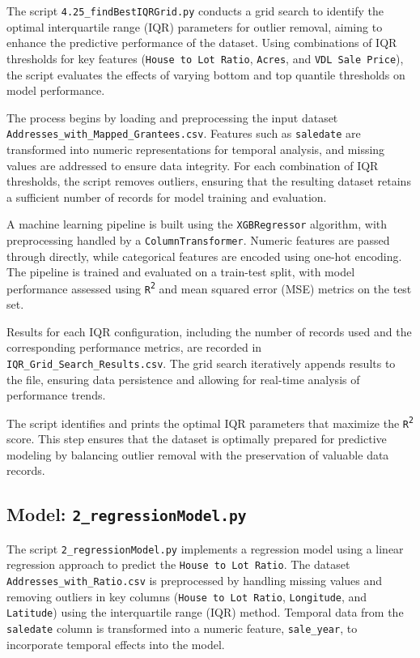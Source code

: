 The script \texttt{4.25\_findBestIQRGrid.py} conducts a grid search to identify the optimal interquartile range (IQR) parameters for outlier removal, aiming to enhance the predictive performance of the dataset. Using combinations of IQR thresholds for key features (\texttt{House to Lot Ratio}, \texttt{Acres}, and \texttt{VDL Sale Price}), the script evaluates the effects of varying bottom and top quantile thresholds on model performance.

The process begins by loading and preprocessing the input dataset \texttt{Addresses\_with\_Mapped\_Grantees.csv}. Features such as \texttt{saledate} are transformed into numeric representations for temporal analysis, and missing values are addressed to ensure data integrity. For each combination of IQR thresholds, the script removes outliers, ensuring that the resulting dataset retains a sufficient number of records for model training and evaluation.

A machine learning pipeline is built using the \texttt{XGBRegressor} algorithm, with preprocessing handled by a \texttt{ColumnTransformer}. Numeric features are passed through directly, while categorical features are encoded using one-hot encoding. The pipeline is trained and evaluated on a train-test split, with model performance assessed using \texttt{R\textsuperscript{2}} and mean squared error (MSE) metrics on the test set.

Results for each IQR configuration, including the number of records used and the corresponding performance metrics, are recorded in \texttt{IQR\_Grid\_Search\_Results.csv}. The grid search iteratively appends results to the file, ensuring data persistence and allowing for real-time analysis of performance trends.

The script identifies and prints the optimal IQR parameters that maximize the \texttt{R\textsuperscript{2}} score. This step ensures that the dataset is optimally prepared for predictive modeling by balancing outlier removal with the preservation of valuable data records. \\

\hrulefill

\subsection{Model: \texttt{2\_regressionModel.py}}

The script \texttt{2\_regressionModel.py} implements a regression model using a linear regression approach to predict the \texttt{House to Lot Ratio}. The dataset \texttt{Addresses\_with\_Ratio.csv} is preprocessed by handling missing values and removing outliers in key columns (\texttt{House to Lot Ratio}, \texttt{Longitude}, and \texttt{Latitude}) using the interquartile range (IQR) method. Temporal data from the \texttt{saledate} column is transformed into a numeric feature, \texttt{sale\_year}, to incorporate temporal effects into the model.

